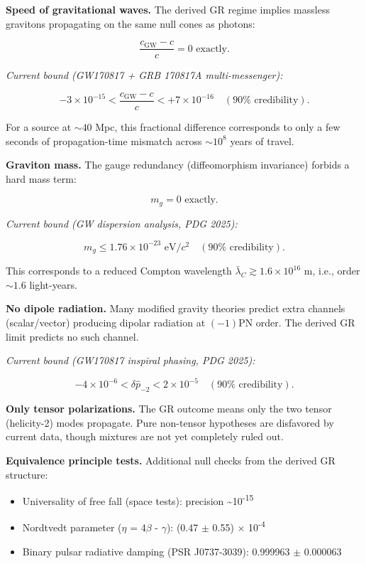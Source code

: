\documentclass[11pt,a4paper]{article}
\theoremstyle{remark}
\providecommand{\tightlist}{%
  \setlength{\itemsep}{0pt}\setlength{\parskip}{0pt}}
\begin{document}
\textbf{Speed of gravitational waves.} The derived GR regime implies massless
gravitons propagating on the same null cones as photons:

\[
\frac{c_{\mathrm{GW}} - c}{c} = 0 \text{ exactly.}
\]

\emph{Current bound (GW170817 + GRB 170817A multi-messenger):}

\[
-3 \times 10^{-15} < \frac{c_{\mathrm{GW}} - c}{c} < +7 \times 10^{-16}
\quad (90\% \text{ credibility}).
\]

For a source at \(\sim 40\) Mpc, this fractional difference corresponds to only
a few seconds of propagation-time mismatch across \(\sim 10^8\) years of travel.

\textbf{Graviton mass.} The gauge redundancy (diffeomorphism invariance) forbids a
hard mass term:

\[
m_g = 0 \text{ exactly.}
\]

\emph{Current bound (GW dispersion analysis, PDG 2025):}

\[
m_g \le 1.76 \times 10^{-23} \text{ eV}/c^2 \quad (90\% \text{ credibility}).
\]

This corresponds to a reduced Compton wavelength
\(\bar{\lambda}_C \gtrsim 1.6 \times 10^{16}\) m, i.e., order \(\sim 1.6\)
light-years.

\textbf{No dipole radiation.} Many modified gravity theories predict extra channels
(scalar/vector) producing dipolar radiation at \((-1)\)PN order. The derived GR
limit predicts no such channel.

\emph{Current bound (GW170817 inspiral phasing, PDG 2025):}

\[
-4 \times 10^{-6} < \delta\hat{p}_{-2} < 2 \times 10^{-5}
\quad (90\% \text{ credibility}).
\]

\textbf{Only tensor polarizations.} The GR outcome means only the two tensor
(helicity-2) modes propagate. Pure non-tensor hypotheses are disfavored by
current data, though mixtures are not yet completely ruled out.

\textbf{Equivalence principle tests.} Additional null checks from the derived GR
structure:

\begin{itemize}
\tightlist
\item
  Universality of free fall (space tests): precision \textasciitilde10\textsuperscript{-15}
\item
  Nordtvedt parameter (\ensuremath{\eta} = 4\ensuremath{\beta} - \ensuremath{\gamma}): (0.47 \ensuremath{\pm} 0.55) \ensuremath{\times} 10\textsuperscript{-4}
\item
  Binary pulsar radiative damping (PSR J0737-3039): 0.999963 \ensuremath{\pm} 0.000063
\end{itemize}
\end{document}
